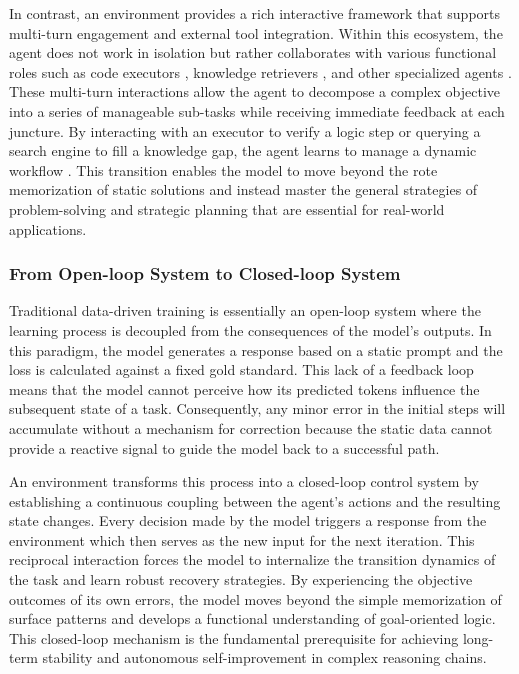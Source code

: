 \documentclass{llmxive}
\begin{document}
In contrast, an environment provides a rich interactive framework that supports multi-turn engagement and external tool integration. Within this ecosystem, the agent does not work in isolation but rather collaborates with various functional roles such as code executors \cite{SWE-Bench, Terminal-Bench, IDE-Bench}, knowledge retrievers \cite{WideSearch,BrowseComp,GAIA}, and other specialized agents \cite{RoboFactory, LLMARENA, unlocking_future, MCPVerse}. These multi-turn interactions allow the agent to decompose a complex objective into a series of manageable sub-tasks while receiving immediate feedback at each juncture. By interacting with an executor to verify a logic step or querying a search engine to fill a knowledge gap, the agent learns to manage a dynamic workflow \cite{AutoFlow, MUSE, AgentFlow}. This transition enables the model to move beyond the rote memorization of static solutions and instead master the general strategies of problem-solving and strategic planning that are essential for real-world applications.

\subsubsection{From Open-loop System to Closed-loop System}
Traditional data-driven training is essentially an open-loop system where the learning process is decoupled from the consequences of the model's outputs. In this paradigm, the model generates a response based on a static prompt and the loss is calculated against a fixed gold standard. This lack of a feedback loop means that the model cannot perceive how its predicted tokens influence the subsequent state of a task. Consequently, any minor error in the initial steps will accumulate without a mechanism for correction because the static data cannot provide a reactive signal to guide the model back to a successful path.

An environment transforms this process into a closed-loop control system by establishing a continuous coupling between the agent's actions and the resulting state changes. Every decision made by the model triggers a response from the environment which then serves as the new input for the next iteration. This reciprocal interaction forces the model to internalize the transition dynamics of the task and learn robust recovery strategies. By experiencing the objective outcomes of its own errors, the model moves beyond the simple memorization of surface patterns and develops a functional understanding of goal-oriented logic. This closed-loop mechanism is the fundamental prerequisite for achieving long-term stability and autonomous self-improvement in complex reasoning chains.
\end{document}

